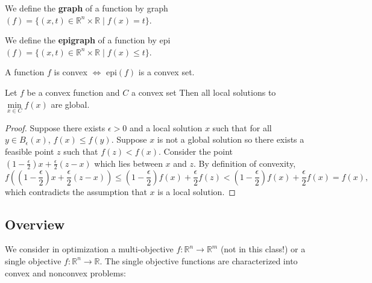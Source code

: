 \documentclass[english, 11pt]{article}
\begin{document}
\begin{defn}[Graph]
We define the {\bf graph} of a function by graph$(f) = \{(x,t) \in \mathbb{R}^n \times \mathbb{R} \mid f(x) = t \}$.
\end{defn}

\begin{defn}[Epigraph]
We define the {\bf epigraph} of a function by epi$(f) = \{(x,t) \in \mathbb{R}^n \times \mathbb{R} \mid f(x) \le t \}$. 
\end{defn}

\begin{thrm}
A function $f$ is convex $\iff$ epi$(f)$ is a convex set.
\end{thrm}

\begin{thrm}
Let $f$ be a convex function and $C$ a convex set Then all local solutions to $\min \limits_{x \in C} f(x)$ are global.
\end{thrm}
\begin{proof}
Suppose there exists $\epsilon>0$ and a local solution $x$ such that for all $y \in B_\epsilon(x)$, $f(x) \le f(y)$. Suppose $x$ is not a global solution so there exists a feasible point $z$ such that $f(z) < f(x)$. Consider the point $\left(1-\frac{\epsilon}{2}\right)x +\frac{\epsilon}{2}(z-x)$ which lies between $x$ and $z$. By definition of convexity, 
\[
f \left( \left(1- \frac{\epsilon}{2}\right)x + \frac{\epsilon}{2}(z-x) \right) \le \left(1- \frac{\epsilon}{2}\right) f(x) + \frac{\epsilon}{2} f(z) < \left(1- \frac{\epsilon}{2}\right) f(x) + \frac{\epsilon}{2} f(x) = f(x),
\]
which contradicts the assumption that $x$ is a local solution.
\end{proof}

\subsection{Overview}

We consider in optimization a multi-objective $f: \mathbb{R}^n \to \mathbb{R}^m$ (not in this class!) or a single objective $f:\mathbb{R}^n \to \mathbb{R}$. The single objective functions are characterized into convex and nonconvex problems:
\end{document}
